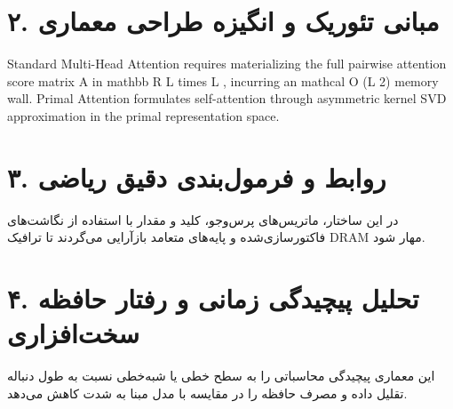 \documentclass[12pt,a4paper]{article}
\begin{document}
\section*{۲. مبانی تئوریک و انگیزه طراحی معماری}
Standard Multi-Head Attention requires materializing the full pairwise attention score matrix A in mathbb R L times L , incurring an mathcal O (L 2) memory wall. Primal Attention formulates self-attention through asymmetric kernel SVD approximation in the primal representation space.

\section*{۳. روابط و فرمول‌بندی دقیق ریاضی}
در این ساختار، ماتریس‌های پرس‌وجو، کلید و مقدار با استفاده از نگاشت‌های فاکتورسازی‌شده و پایه‌های متعامد بازآرایی می‌گردند تا ترافیک DRAM مهار شود.

\section*{۴. تحلیل پیچیدگی زمانی و رفتار حافظه سخت‌افزاری}
این معماری پیچیدگی محاسباتی را به سطح خطی یا شبه‌خطی نسبت به طول دنباله تقلیل داده و مصرف حافظه را در مقایسه با مدل مبنا به شدت کاهش می‌دهد.
\end{document}
